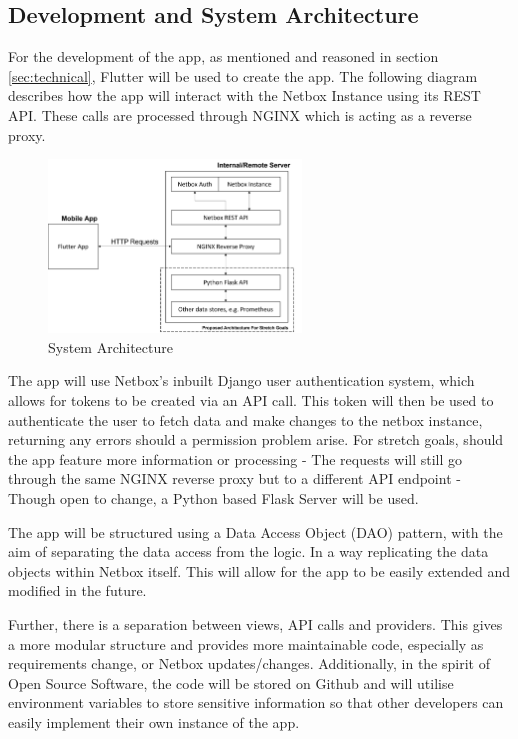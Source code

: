 \documentclass [11pt,letterpaper]{article}
\begin{document}
\subsection{Development and System Architecture}
\label{sec:development} 
For the development of the app, as mentioned and reasoned in section \ref{sec:technical}, Flutter will be used to create the app. The following diagram describes how the app will interact with the Netbox Instance using its REST API. These calls are processed through NGINX which is acting as a reverse proxy.
\begin{figure}[h]
    \centering
    \includegraphics[width=0.6\textwidth]{images/top-level-archi.png}
    \caption{System Architecture}
    \label{fig:architecture}
\end{figure}

The app will use Netbox's inbuilt Django user authentication system, which allows for tokens to be created via an API call. This token will then be used to authenticate the user to fetch data and make changes to the netbox instance, returning any errors should a permission problem arise. For stretch goals, should the app feature more information or processing - The requests will still go through the same NGINX reverse proxy but to a different API endpoint - Though open to change, a Python based Flask Server will be used. 

The app will be structured using a Data Access Object (DAO) pattern\cite{dao}, with the aim of separating the data access from the logic. In a way replicating the data objects within Netbox itself. This will allow for the app to be easily extended and modified in the future. 

Further, there is a separation between views, API calls and providers. This gives a more modular structure and provides more maintainable code, especially as requirements change, or Netbox updates/changes. Additionally, in the spirit of Open Source Software, the code will be stored on Github \cite{keeptrackgithub} and will utilise environment variables to store sensitive information so that other developers can easily implement their own instance of the app.
\end{document}
